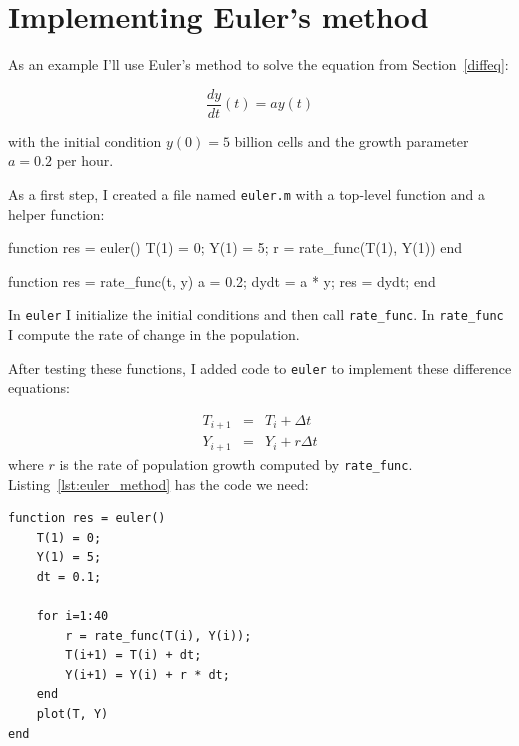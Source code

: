 

\section{Implementing Euler's method}

As an example I'll use Euler's method to solve the equation from Section~\ref{diffeq}:

\[ \frac{dy}{dt}(t) = a y(t) \]

with the initial condition $y(0) = 5$ billion cells and
the growth parameter $a = 0.2$ per hour. 


As a first step, I created a file named {\tt euler.m} with a top-level function and a helper function:

\begin{code}
function res = euler()
    T(1) = 0;
    Y(1) = 5;
    r = rate_func(T(1), Y(1))
end

function res = rate_func(t, y)
   a = 0.2;
   dydt = a * y;
   res = dydt;
end
\end{code}

In {\tt euler} I initialize the initial conditions and then call \verb"rate_func".  In \verb"rate_func" I compute the rate of change in the population.


After testing these functions, I added code to {\tt euler} to implement these difference equations:

\begin{eqnarray}
T_{i+1} &=& T_i + \Delta t             \\
Y_{i+1} &=& Y_i + r \Delta t          
\end{eqnarray}
%
where $r$ is the rate of population growth computed by \verb"rate_func".
Listing~\ref{lst:euler_method} has the code we need:

\begin{lstlisting}[caption={A function implementing Euler's method}, label={lst:euler_method}]
function res = euler()
    T(1) = 0;
    Y(1) = 5;
    dt = 0.1;
    
    for i=1:40
        r = rate_func(T(i), Y(i));
        T(i+1) = T(i) + dt;
        Y(i+1) = Y(i) + r * dt;
    end
    plot(T, Y)
end
\end{lstlisting}

